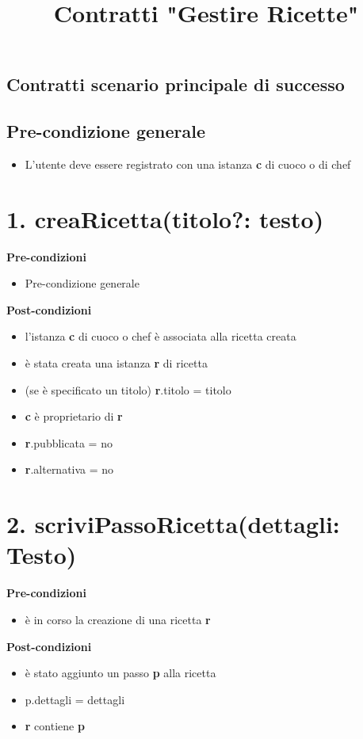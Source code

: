 \documentclass[12pt]{extarticle}
\begin{document}
\title{Contratti "Gestire Ricette"}
\date{}
\maketitle

\begin{center}
  \section*{Contratti scenario principale di successo}
\end{center}

\subsection*{Pre-condizione generale}
\begin{itemize}
  \item L'utente deve essere registrato con una istanza \textbf{c} di cuoco o di chef
\end{itemize}

\section*{1. creaRicetta(titolo?: testo)}
\textbf{Pre-condizioni}
\begin{itemize}
  \item Pre-condizione generale
\end{itemize}
\textbf{Post-condizioni}
\begin{itemize}
  \item l'istanza \textbf{c} di cuoco o chef è associata alla ricetta creata
  \item è stata creata una istanza \textbf{r} di ricetta
  \item (se è specificato un titolo) \textbf{r}.titolo = titolo
  \item \textbf{c} è proprietario di \textbf{r}
  \item \textbf{r}.pubblicata = no
  \item \textbf{r}.alternativa = no
\end{itemize}

\section*{2. scriviPassoRicetta(dettagli: Testo)}

\textbf{Pre-condizioni} 	
\begin{itemize}
  \item è in corso la creazione di una ricetta  \textbf{r}
\end{itemize}
\textbf{Post-condizioni}
\begin{itemize}
  \item è stato aggiunto un passo  \textbf{p} alla ricetta
  \item p.dettagli = dettagli
  \item  \textbf{r} contiene  \textbf{p}
\end{itemize}
\end{document}
